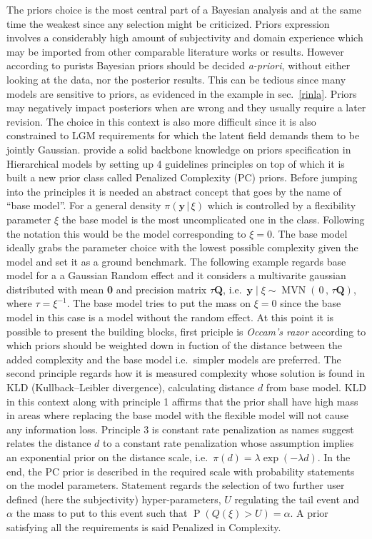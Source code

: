 \documentclass[
  12pt,
  a4paper,
  oneside]{book}
\theoremstyle{definition}
\theoremstyle{definition}
\theoremstyle{definition}
\theoremstyle{remark}
\begin{document}
The priors choice is the most central part of a Bayesian analysis and at the same time the weakest since any selection might be criticized. Priors expression involves a considerably high amount of subjectivity and domain experience which may be imported from other comparable literature works or results. However according to purists Bayesian priors should be decided \emph{a-priori}, without either looking at the data, nor the posterior results. This can be tedious since many models are sensitive to priors, as evidenced in the example in sec.~\ref{rinla}. Priors may negatively impact posteriors when are
wrong and they usually require a later revision. The choice in this context is also more difficult since it is also constrained to LGM requirements for which the latent field demands them to be jointly Gaussian.
\citet{simpson2017} provide a solid backbone knowledge on priors specification in Hierarchical models by setting up 4 guidelines principles on top of which it is built a new prior class called Penalized Complexity (PC) priors. Before jumping into the principles it is needed an abstract concept that goes by the name of ``base model''. For a general density \(\pi(\mathbf{y} \,| \,\xi)\) which is controlled by a flexibility parameter \(\xi\) the base model is the most uncomplicated one in the class. Following the notation this would be the model corresponding to \(\xi = 0\). The base model ideally grabs the parameter choice with the lowest possible complexity given the model and set it as a ground benchmark. The following example regards base model for a a Gaussian Random effect and it considers a multivarite gaussian distributed with mean \textbf{0} and precision matrix \(\tau \boldsymbol{Q}\), i.e.~\(\mathbf{y} \mid \xi \sim \operatorname{MVN}(\, 0\, ,\,\tau \boldsymbol{Q})\), where \(\tau=\xi^{-1}\). The base model tries to put the mass \citeyearpar{simpson2017} on \(\xi = 0\) since the base model in this case is a model without the random effect. At this point it is possible to present the building blocks, first priciple is \emph{Occam's razor} according to which priors should be weighted down in fuction of the distance between the added complexity and the base model i.e.~simpler models are preferred. The second principle regards how it is measured complexity whose solution is found in KLD (Kullback--Leibler divergence), calculating distance \(d\) from base model. KLD in this context along with principle 1 affirms that the prior shall have high mass in areas where replacing the base model with the flexible model will not cause any information loss. Principle 3 is constant rate penalization as names suggest relates the distance \(d\) to a constant rate penalization whose assumption implies an exponential prior on the distance scale, i.e.~\(\pi(d) = \lambda \exp (-\lambda d)\). In the end, the PC prior is described in the required scale with probability statements on the model parameters. Statement regards the selection of two further user defined (here the subjectivity) hyper-parameters, \(U\) regulating the tail event and \(\alpha\) the mass to put to this event such that \(\operatorname{P}(Q(\xi)>U)=\alpha\). A prior satisfying all the requirements is said Penalized in Complexity.
\end{document}
